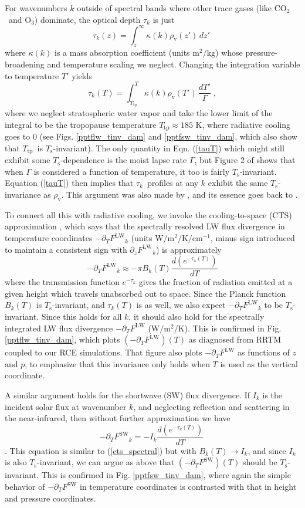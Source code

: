 \documentclass[10pt]{article}
\newcommand{\beqn}{\begin{equation}}
\newcommand{\eeqn}{\end{equation}}
\newcommand{\eqnref}[1]{(\ref{#1})}
\newcommand{\der}[2]{\ensuremath{\frac{d #1}{d #2}}}
\newcommand{\ppz}{\ensuremath{\partial_z}}
\newcommand{\ppt}{\ensuremath{\partial_T}}
\newcommand{\cotwo}{\ensuremath{\mathrm{CO_2}}}
\newcommand{\othree}{\ensuremath{\mathrm{O_3}}}
\newcommand{\FLW}{\ensuremath{F^\mathrm{LW}}}
\newcommand{\FSW}{\ensuremath{F^\mathrm{SW}}}
\newcommand{\cminverse}{\ensuremath{\mathrm{cm^{-1}}}}
\newcommand{\tauk}{\ensuremath{\tau_k}}
\newcommand{\Wmsq}{\ensuremath{\mathrm{W/m^2}}}
\newcommand{\rhov}{\ensuremath{\rho_\mathrm{v}}}
\newcommand{\Ts}{\ensuremath{T_\mathrm{s}}}
\newcommand{\Ttp}{\ensuremath{T_\mathrm{tp}}}
\begin{document}
	For wavenumbers $k$ outside of spectral bands where other trace gases (like \cotwo\ and \othree) dominate, the optical depth $\tauk$ is just
	\beqn
		\tau_k(z) = \int_z^\infty \kappa(k)  \rhov(z') \, dz'  \; 
		\label{tauz}
	\eeqn
		where $\kappa(k)$ is a  mass absorption coefficient  (units $\mathrm{m^2/kg}$) whose pressure-broadening and temperature scaling we neglect. Changing the integration variable to temperature $T'$ yields
		\beqn
		\tau_k(T) = \int_{\Ttp}^T \kappa(k)  \rhov(T') \, \frac{dT'}{\Gamma}  \; ,
		\label{tauT}
	\eeqn
	where we neglect stratospheric water vapor and take the lower limit of the integral to be the tropopause temperature $\Ttp \approx 185$ K, where radiative cooling goes to 0 (see Figs. \ref{pptflw_tinv_dam} and  \ref{pptfsw_tinv_dam}, which also show that \Ttp\ is \Ts-invariant). The only quantity in Eqn. \eqnref{tauT} which might still exhibit some \Ts-dependence is the  moist lapse rate $\Gamma$, but Figure 2 of \cite{ingram2010} shows that when $\Gamma$ is considered a function of temperature, it too is fairly  \Ts-invariant. Equation \eqnref{tauT} then implies that \tauk\ profiles at any $k$ exhibit the same \Ts-invariance as \rhov. This argument was also made by \cite{ingram2010}, and its essence goes back to  \cite{simpson1928}.
	
	To connect all this with radiative cooling, we invoke the cooling-to-space (CTS) approximation \citep[e.g.,][]{thomas2002}, which says that the spectrally resolved LW flux divergence in temperature coordinates $-\ppt \FLW_k$ (units $\Wmsq/\mathrm{K}/\cminverse$, minus sign introduced to maintain a consistent sign with  $\ppz \FLW_k$) is approximately
	\beqn
		-\ppt \FLW_k \approx - \pi B_k(T) \frac{d (e^{-\tauk(T)})}{dT}
	\label{cts_spectral}
	\eeqn
where  the transmission function $e^{-\tauk}$ gives the fraction of radiation emitted at a given height which travels unabsorbed out to space. Since the Planck function $B_k(T)$ is \Ts-invariant, and $\tauk(T)$ is as well, we also expect $-\ppt \FLW_k$ to be \Ts-invariant. Since this holds for all $k$, it should also hold for the spectrally integrated LW flux divergence $-\ppt \FLW$ ($\Wmsq/\mathrm{K}$). This is confirmed in 
 Fig.  \ref{pptflw_tinv_dam}, which plots $(-\ppt \FLW)(T)$ as diagnosed from RRTM coupled to our  RCE simulations.  That figure also plots $-\ppt \FLW$ as functions of $z$ and $p$, to emphasize that this invariance only holds  when $T$ is used as the vertical coordinate.
	
	A similar argument holds for the shortwave (SW) flux divergence. If $I_k$ is the incident solar flux at wavenumber $k$, and  neglecting reflection and scattering in the  near-infrared, 
then without further approximation we have
	\beqn
		-\ppt \FSW_k = - I_k \der{(e^{-\tauk(T)})}{T}
		\
	\eeqn
\citep[c.f.][eqn. 9.26]{thomas2002}. This equation is similar to  \eqnref{cts_spectral} but with $B_k(T) \rightarrow I_k$, and since $I_k$ is also \Ts-invariant, we can argue as above that $(-\ppt \FSW)(T)$ should be \Ts-invariant. This is confirmed in Fig. \ref{pptfsw_tinv_dam}, where again the simple behavior of $-\ppt \FSW$ in temperature coordinates is contrasted with that in height and pressure coordinates.
\end{document}
